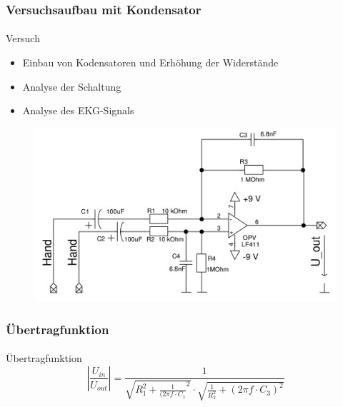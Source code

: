 \begin{frame}
\begin{columns}[c]
\begin{figure}[H]
\begin{center}
    \end{center}
    \end{figure}
    
    \end{columns}
\end{frame}
\begin{frame}
\frametitle{Versuchsaufbau mit Kondensator}
\framesubtitle{}
    \begin{block}{Versuch}
        \begin{itemize}
            \item Einbau von Kodensatoren und Erhöhung der Widerstände 
            \item Analyse der Schaltung
            \item Analyse des EKG-Signals
        \end{itemize}    
    \end{block}
    \begin{figure}[H]
    \begin{center}
            \includegraphics[scale=0.2]{./img/schaltung/dif_verst_2.png}
    \end{center}
    \end{figure}
\end{frame}
\begin{frame}
\frametitle{Übertragfunktion}
\framesubtitle{}
    \begin{block}{Übertragfunktion}
         \begin{equation*}
             | \frac{U_{in}}{U_{out}} |
             =
             \frac{1}{\sqrt{R_1^2 + \frac{1}{(2\pi f \cdot C_1}^2} \cdot
             \sqrt{\frac{1}{R_2^2}+(2\pi f \cdot C_3)^2}}
         \end{equation*}
    \end{block}
\end{frame}
